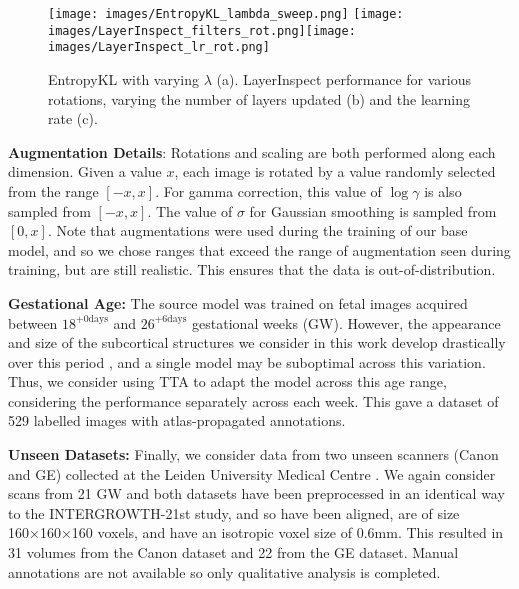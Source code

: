 \documentclass[conference]{IEEEtran}
\begin{document}
\begin{figure}
    \centering
     \texttt{[image: images/EntropyKL\_lambda\_sweep.png]}
     \texttt{[image: images/LayerInspect\_filters\_rot.png]}\texttt{[image: images/LayerInspect\_lr\_rot.png]}
    \caption{EntropyKL with varying $\lambda$ (a). LayerInspect performance for various rotations, varying the number of layers updated (b) and the learning rate (c).}
    \label{fig:layer-inspect-hyperparam}
    \vspace*{-15pt}
\end{figure}

\textbf{Augmentation Details}: Rotations and scaling are both performed along each dimension. Given a value $x$, each image is rotated by a value randomly selected from the range $[-x, x]$. For gamma correction, this value of $\log \gamma$ is also sampled from $[-x, x]$. The value of $\sigma$ for Gaussian smoothing is sampled from $[0, x]$. Note that augmentations were used during the training of our base model, and so we chose ranges that exceed the range of augmentation seen during training, but are still realistic. This ensures that the data is out-of-distribution. 

\noindent \textbf{Gestational Age:}
The source model was trained on fetal images acquired between $18^{+0 \mathrm{days}}$ and $26^{+6 \mathrm{days}}$ gestational weeks (GW). However, the appearance and size of the subcortical structures we consider in this work develop drastically over this period \cite{Namburete2023}, and a single model may be suboptimal across this variation. Thus, we consider using TTA to adapt the model across this age range, considering the performance separately across each week. This gave a dataset of 529 labelled images with atlas-propagated annotations. 

\noindent \textbf{Unseen Datasets:}
Finally, we consider data from two unseen scanners (Canon and GE) collected at the Leiden University Medical Centre \cite{yeung2024implicitvol}. We again consider scans from 21 GW and both datasets have been preprocessed in an identical way to the INTERGROWTH-21st study, and so have been aligned, are of size 160×160×160 voxels, and have an isotropic voxel size of 0.6mm. This resulted in 31 volumes from the Canon dataset and 22 from the GE dataset. Manual annotations are not available so only qualitative analysis is completed. 
\end{document}

